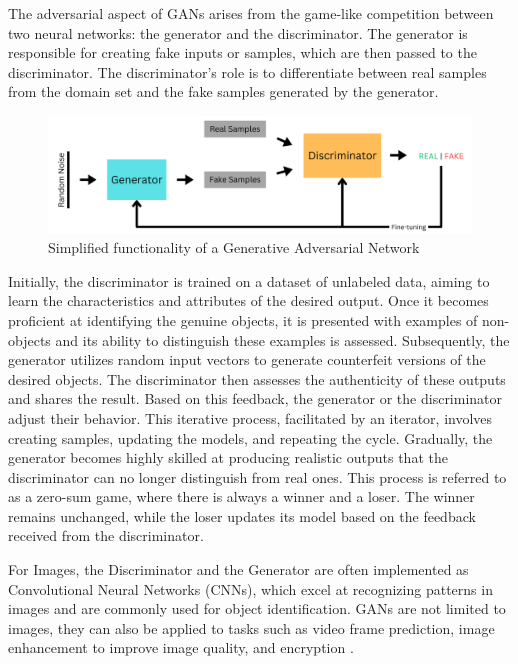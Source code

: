 The adversarial aspect of GANs arises from the game-like competition between two neural networks: the generator and the discriminator. The generator is responsible for creating fake inputs or samples, which are then passed to the discriminator. The discriminator's role is to differentiate between real samples from the domain set and the fake samples generated by the generator.

\begin{figure}[ht]
\centering
  \includegraphics[width=1\columnwidth]{figures/Generator.png}
  \caption{Simplified functionality of a Generative Adversarial Network}\label{fig:figureGAN}
\end{figure}

Initially, the discriminator is trained on a dataset of unlabeled data, aiming to learn the characteristics and attributes of the desired output. Once it becomes proficient at identifying the genuine objects, it is presented with examples of non-objects and its ability to distinguish these examples is assessed. 
Subsequently, the generator utilizes random input vectors to generate counterfeit versions of the desired objects. 
The discriminator then assesses the authenticity of these outputs and shares the result. Based on this feedback, the generator or the discriminator adjust their behavior. This iterative process, facilitated by an iterator, involves creating samples, updating the models, and repeating the cycle. Gradually, the generator becomes highly skilled at producing realistic outputs that the discriminator can no longer distinguish from real ones. This process is referred to as a zero-sum game, where there is always a winner and a loser. The winner remains unchanged, while the loser updates its model based on the feedback received from the discriminator.

For Images, the Discriminator and the Generator are often implemented as Convolutional Neural Networks (CNNs), which excel at recognizing patterns in images and are commonly used for object identification.
GANs are not limited to images, they can also be applied to tasks such as video frame prediction, image enhancement to improve image quality, and encryption \citep{goodfellowGAN}.

